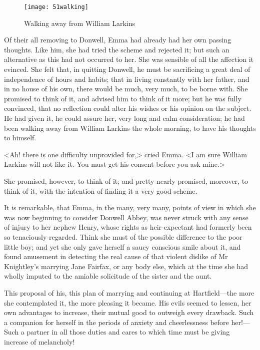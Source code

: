 \begin{figure}[tbph]
\centering
\texttt{[image: 51walking]}
\caption{Walking away from William Larkins}
\end{figure}

Of their all removing to Donwell, Emma had already had her own passing thoughts. Like him, she had tried the scheme and rejected it; but such an alternative as this had not occurred to her. She was sensible of all the affection it evinced. She felt that, in quitting Donwell, he must be sacrificing a great deal of independence of hours and habits; that in living constantly with her father, and in no house of his own, there would be much, very much, to be borne with. She promised to think of it, and advised him to think of it more; but he was fully convinced, that no reflection could alter his wishes or his opinion on the subject. He had given it, he could assure her, very long and calm consideration; he had been walking away from William Larkins the whole morning, to have his thoughts to himself.

<Ah! there is one difficulty unprovided for,> cried Emma. <I am sure William Larkins will not like it. You must get his consent before you ask mine.>

She promised, however, to think of it; and pretty nearly promised, moreover, to think of it, with the intention of finding it a very good scheme.

It is remarkable, that Emma, in the many, very many, points of view in which she was now beginning to consider Donwell Abbey, was never struck with any sense of injury to her nephew Henry, whose rights as heir-expectant had formerly been so tenaciously regarded. Think she must of the possible difference to the poor little boy; and yet she only gave herself a saucy conscious smile about it, and found amusement in detecting the real cause of that violent dislike of Mr Knightley's marrying Jane Fairfax, or any body else, which at the time she had wholly imputed to the amiable solicitude of the sister and the aunt.

This proposal of his, this plan of marrying and continuing at Hartfield—the more she contemplated it, the more pleasing it became. His evils seemed to lessen, her own advantages to increase, their mutual good to outweigh every drawback. Such a companion for herself in the periods of anxiety and cheerlessness before her!—Such a partner in all those duties and cares to which time must be giving increase of melancholy!

